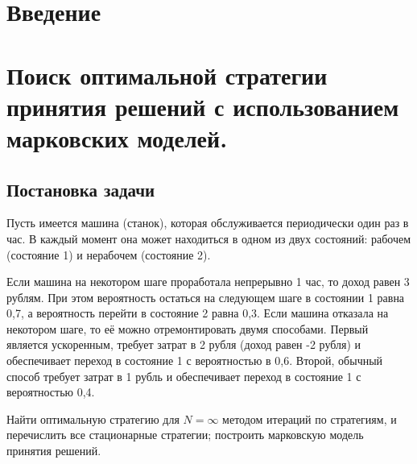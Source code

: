 \documentclass[a4paper, 12pt]{article}		%
\begin{document}

\tableofcontents

%
\newpage
\section*{Введение}






\newpage
\section{Поиск оптимальной стратегии принятия решений с использованием марковских моделей.}

\subsection{Постановка задачи}
Пусть имеется машина (станок), которая обслуживается периодически один раз в час. В каждый момент она может находиться в одном из двух состояний: рабочем (состояние 1) и нерабочем (состояние 2).

Если машина на некотором шаге проработала непрерывно 1 час, то доход равен 3 рублям. При этом вероятность остаться на следующем шаге в состоянии 1 равна 0,7, а вероятность перейти в состояние 2 равна 0,3. Если машина отказала на некотором шаге, то её можно отремонтировать двумя способами. Первый является ускоренным, требует затрат в 2 рубля (доход равен -2 рубля) и обеспечивает переход в состояние 1 с вероятностью в 0,6. Второй, обычный способ требует затрат в 1 рубль и обеспечивает переход в состояние 1 с вероятностью 0,4.

Найти оптимальную стратегию для $N=\infty$ методом итераций по стратегиям, и перечислить все стационарные стратегии; построить марковскую модель принятия решений.

\end{document}
